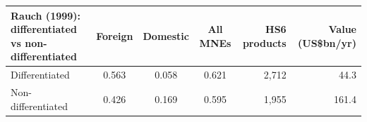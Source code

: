 \begin{tabular}{lcccrr}
\toprule
Rauch (1999): differentiated vs non-differentiated & Foreign & Domestic & All MNEs & HS6 products & Value (US\$bn/yr) \\
\midrule
Differentiated & 0.563 & 0.058 & 0.621 & 2,712 & 44.3 \\
Non-differentiated & 0.426 & 0.169 & 0.595 & 1,955 & 161.4 \\
\bottomrule
\end{tabular}
